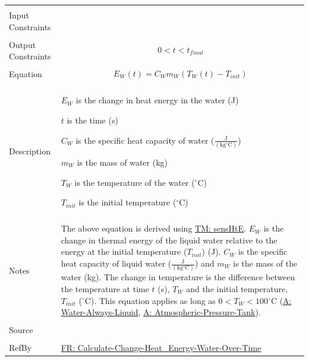 \documentclass[12pt]{article}
\begin{document}
\begin{minipage}{\textwidth}
\begin{tabular}{>{\raggedright}p{}>{\raggedright\arraybackslash}p{}}
\\ \midrule \\
Input Constraints & 
\\ \midrule \\
Output Constraints & \begin{displaymath}
                     0<t<{t_{final}}
                     \end{displaymath}
\\ \midrule \\
Equation & \begin{displaymath}
           {E_{W}}\left(t\right)={C_{W}} {m_{W}} \left({T_{W}}\left(t\right)-{T_{init}}\right)
           \end{displaymath}
\\ \midrule \\
Description & \begin{symbDescription}
              \item{${E_{W}}$ is the change in heat energy in the water (J)}
              \item{$t$ is the time (s)}
              \item{${C_{W}}$ is the specific heat capacity of water ($\frac{\text{J}}{(\text{kg}{}^{\circ}\text{C})}$)}
              \item{${m_{W}}$ is the mass of water (kg)}
              \item{${T_{W}}$ is the temperature of the water (${}^{\circ}$C)}
              \item{${T_{init}}$ is the initial temperature (${}^{\circ}$C)}
              \end{symbDescription}
\\ \midrule \\
Notes & The above equation is derived using \hyperref[TM:sensHtE]{TM: sensHtE}. ${E_{W}}$ is the change in thermal energy of the liquid water relative to the energy at the initial temperature (${T_{init}}$) (J). ${C_{W}}$ is the specific heat capacity of liquid water ($\frac{\text{J}}{(\text{kg}{}^{\circ}\text{C})}$) and ${m_{W}}$ is the mass of the water (kg). The change in temperature is the difference between the temperature at time $t$ (s), ${T_{W}}$ and the initial temperature, ${T_{init}}$ (${}^{\circ}$C). This equation applies as long as $0<{T_{W}}<100$${}^{\circ}$C (\hyperref[assumpWAL]{A: Water-Always-Liquid}, \hyperref[assumpAPT]{A: Atmospheric-Pressure-Tank}).
        
\\ \midrule \\
Source & \cite{koothoor2013}
         
\\ \midrule \\
RefBy & \hyperref[calcChgHeatEnergyWtrOverTime]{FR: Calculate-Change-Heat\_Energy-Water-Over-Time}
        
\\ \bottomrule
\end{tabular}
\end{minipage}
\end{document}
